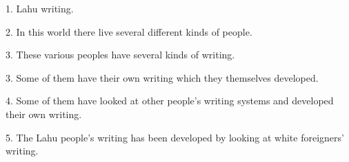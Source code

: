 \setcounter{footnote}{0}

1. Lahu writing.

2. In this world there live several different kinds of people.

3. These various peoples have several kinds of writing.

3. Some of them have their own writing which they themselves developed.

4. Some of them have looked at other people's writing systems and developed their own writing.

5. The Lahu people's writing has been developed by looking at white foreigners' writing.

